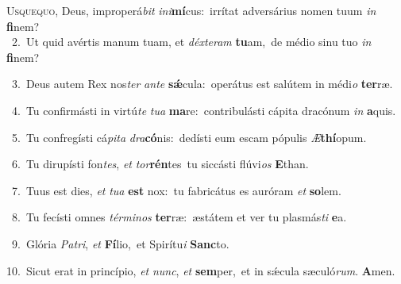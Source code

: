 \lettrine{\initial\textcolor{\initialcolor}{U}}{squequo,} Deus, improperá\textit{bit} \textit{in}\-\textit{i}\textbf{mí}cus:~\star irrítat adversárius nomen tuum \textit{in} \textbf{fi}\-nem?\\
{\numbfont\textcolor{\numbcolor}{~2.}}~Ut quid avértis manum tuam, et \textit{déx}\-\textit{te}\textit{ram} \textbf{tu}\-am,~\star de médio sinu tuo \textit{in} \textbf{fi}\-nem?\par
{\numbfont\textcolor{\numbcolor}{~3.}}~Deus autem Rex nos\textit{ter} \textit{an}\-\textit{te} \textbf{sǽ}\-cula:~\star operátus est salútem in médi\textit{o} \textbf{ter}\-ræ.\par
{\numbfont\textcolor{\numbcolor}{~4.}}~Tu confirmásti in virtú\textit{te} \textit{tu}\-\textit{a} \textbf{ma}\-re:~\star contribulásti cápita dracónum \textit{in} \textbf{a}\-quis.\par
{\numbfont\textcolor{\numbcolor}{~5.}}~Tu confregísti cá\-\textit{pi}\-\textit{ta} \textit{dra}\-\textbf{có}nis:~\star dedísti eum escam pópulis \textit{Æ}\-\textbf{thí}opum.\par
{\numbfont\textcolor{\numbcolor}{~6.}}~Tu dirupísti fon\-\textit{tes}\-, \textit{et} \textit{tor}\-\textbf{rén}tes~\star tu siccásti flúvi\textit{os} \textbf{E}\-than.\par
{\numbfont\textcolor{\numbcolor}{~7.}}~Tuus est dies, \textit{et} \textit{tu}\-\textit{a} \textbf{est} nox:~\star tu fabricátus es auróram \textit{et} \textbf{so}\-lem.\par
{\numbfont\textcolor{\numbcolor}{~8.}}~Tu fecísti omnes \textit{tér}\-\textit{mi}\textit{nos} \textbf{ter}\-ræ:~\star æstátem et ver tu plasmás\textit{ti} \textbf{e}\-a.\par
{\numbfont\textcolor{\numbcolor}{~9.}}~Glória \textit{Pa}\-\textit{tri}, \textit{et} \textbf{Fí}\-lio,~\star et Spirítu\textit{i} \textbf{Sanc}\-to.\par
{\numbfont\textcolor{\numbcolor}{10.}}~Sicut erat in princípio, \textit{et} \textit{nunc}\-, \textit{et} \textbf{sem}\-per,~\star et in sǽcula sæculó\-\textit{rum}\-. \textbf{A}\-men.\par
